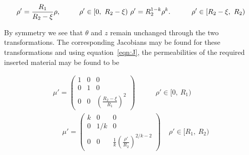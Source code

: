 \documentclass[11pt]{iopart}
\begin{document}
\begin{equation}
  \label{transform}
\rho' = \frac{R_1}{R_2-\xi}\rho,~~~~~~~~\rho'\in[0,~R_2-\xi)~~\\
\rho' = R_2^{1-k}\rho^k.~~~~~~~~~\rho'\in[R_2-\xi,~R_2)
\end{equation}

By symmetry we see that $\theta$ and $z$ remain unchanged through the
two transformations. The corresponding Jacobians may be found for
these transformations and using equation~\ref{eqn:J}, the
permeabilities of the required inserted material may be found to be

\begin{equation}
  \label{eqn:mat}
  \begin{split}
 \mu' = \begin{pmatrix}1&0&0\\0&1&0\\0&0&(\frac{R_2-\xi}{R_1})^2\end{pmatrix}~~~~~~~~~~~~~\rho'\in[0,~R_1)~~\\
~~~~~~\mu' = \begin{pmatrix}k&0&0\\0&1/k&0\\0&0&\frac{1}{k}(\frac{\rho'}{R_2})^{2/k-2}\end{pmatrix}~~~~~\rho'\in[R_1,~R_2)
  \end{split}
\end{equation}
\end{document}
